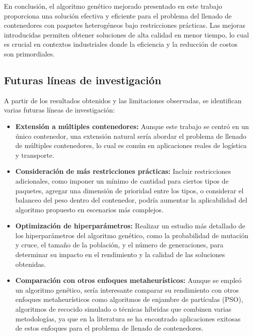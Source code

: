 En conclusión, el algoritmo genético mejorado presentado en este trabajo proporciona una solución efectiva y eficiente para el problema del llenado de contenedores con paquetes heterogéneos bajo restricciones prácticas. Las mejoras introducidas permiten obtener soluciones de alta calidad en menor tiempo, lo cual es crucial en contextos industriales donde la eficiencia y la reducción de costos son primordiales.

\subsection{Futuras líneas de investigación}

A partir de los resultados obtenidos y las limitaciones observadas, se identifican varias futuras líneas de investigación:

\begin{itemize}
    \item \textbf{Extensión a múltiples contenedores:} Aunque este trabajo se centró en un único contenedor, una extensión natural sería abordar el problema de llenado de múltiples contenedores, lo cual es común en aplicaciones reales de logística y transporte.

    \item \textbf{Consideración de más restricciones prácticas:} Incluir restricciones adicionales, como imponer un mínimo de cantidad para ciertos tipos de paquetes, agregar una dimensión de prioridad entre los tipos, o considerar el balanceo del peso dentro del contenedor, podría aumentar la aplicabilidad del algoritmo propuesto en escenarios más complejos.

    \item \textbf{Optimización de hiperparámetros:} Realizar un estudio más detallado de los hiperparámetros del algoritmo genético, como la probabilidad de mutación y cruce, el tamaño de la población, y el número de generaciones, para determinar su impacto en el rendimiento y la calidad de las soluciones obtenidas.

    \item \textbf{Comparación con otros enfoques metaheurísticos:} Aunque se empleó un algoritmo genético, sería interesante comparar su rendimiento con otros enfoques metaheurísticos como algoritmos de enjambre de partículas (PSO), algoritmos de recocido simulado o técnicas híbridas que combinen varias metodologías, ya que en la literatura se ha encontrado aplicaciones exitosas de estos enfoques para el problema de llenado de contenedores.


\end{itemize}
